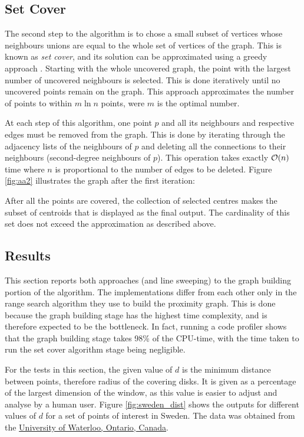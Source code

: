 \subsection{Set Cover}
The second step to the algorithm is to chose a small subset of vertices whose neighbours unions are equal to the whole set of vertices of the graph. This is known as \emph{set cover}, and its solution can be approximated using a greedy approach \cite{approxalgos}. Starting with the whole uncovered graph, the point with the largest number of uncovered neighbours is selected. This is done iteratively until no uncovered points remain on the graph. This approach approximates the number of points to within $m \ln{n}$ points, were $m$ is the optimal number.

At each step of this algorithm, one point $p$ and all its neighbours and respective edges must be removed from the graph. This is done by iterating through the adjacency lists of the neighbours of $p$ and deleting all the connections to their neighbours (second-degree neighbours of $p$). This operation takes exactly $\mathcal{O}(n)$ time where $n$ is proportional to the number of edges to be deleted. Figure \ref{fig:aa2} illustrates the graph after the first iteration:



After all the points are covered, the collection of selected centres makes the subset of centroids that is displayed as the final output. The cardinality of this set does not exceed the approximation as described above.


\subsection{Results}
This section reports both approaches (\kdtrees and line sweeping) to the graph building portion of the algorithm. The implementations differ from each other only in the range search algorithm they use to build the proximity graph. This is done because the graph building stage has the highest time complexity, and is therefore expected to be the bottleneck. In fact, running a code profiler shows that the graph building stage takes 98\% of the CPU-time, with the time taken to run the set cover algorithm stage being negligible.

For the tests in this section, the given value of $d$ is the minimum distance between points, therefore radius of the covering disks. It is given as a percentage of the largest dimension of the window, as this value is easier to adjust and analyse by a human user.
Figure \ref{fig:sweden_dist} shows the outputs for different values of $d$ for a set of points of interest in Sweden. The data was obtained from the \href{http://www.math.uwaterloo.ca/tsp/world/swpoints.html}{University of Waterloo, Ontario, Canada}\cite{waterloo_sweden}.


